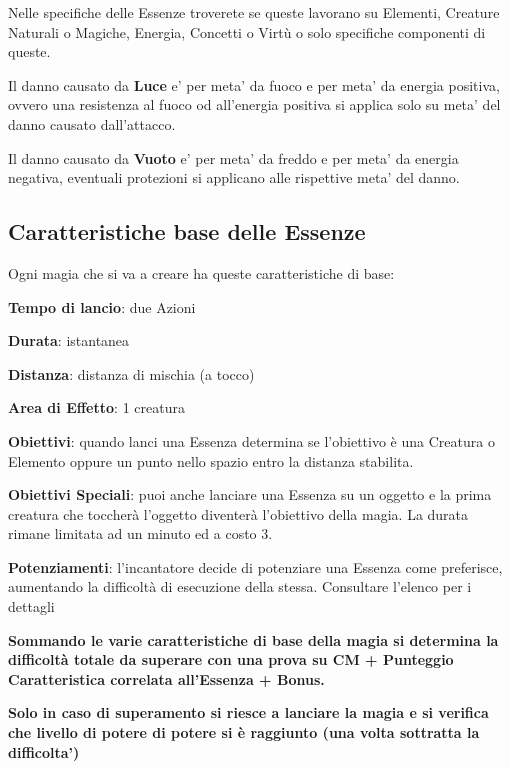 \documentclass[a4paper,11pt,twoside,openany]{book}
\begin{document}
\bigskip

Nelle specifiche delle Essenze troverete se queste lavorano su Elementi, Creature Naturali o Magiche, Energia, Concetti o Virtù o solo specifiche componenti di queste.

Il danno causato da \textbf{Luce} e' per meta' da fuoco e per meta' da energia positiva, ovvero una resistenza al fuoco od all'energia positiva si applica solo su meta' del danno causato dall'attacco.

Il danno causato da \textbf{Vuoto} e' per meta' da freddo e per meta' da energia negativa, eventuali protezioni si applicano alle rispettive meta' del danno.

\subsection{Caratteristiche base delle Essenze}

\label{caratteristiche-base-delle-essenze}

Ogni magia che si va a creare ha queste caratteristiche di base:

\smallskip

\textbf{Tempo di lancio}: due Azioni

\textbf{Durata}: istantanea

\textbf{Distanza}: distanza di mischia (a tocco)

\textbf{Area di Effetto}: 1 creatura 

\textbf{Obiettivi}: quando lanci una Essenza determina se l'obiettivo è una Creatura o Elemento oppure un punto nello spazio entro la distanza stabilita.

\textbf{Obiettivi Speciali}: puoi anche lanciare una Essenza su un oggetto e la prima creatura che toccherà l'oggetto diventerà l'obiettivo della magia. La durata rimane limitata ad un minuto ed a costo 3.

\textbf{Potenziamenti}: l'incantatore decide di potenziare una Essenza come preferisce, aumentando la difficoltà di esecuzione della stessa. Consultare l'elenco per i dettagli

\textbf{Sommando le varie caratteristiche di base della magia si determina la difficoltà totale da superare con una prova su CM + Punteggio Caratteristica correlata all'Essenza + Bonus.}

\textbf{Solo in caso di superamento si riesce a lanciare la magia e si verifica che livello di potere di potere si è raggiunto (una volta sottratta la difficolta')}
\end{document}
